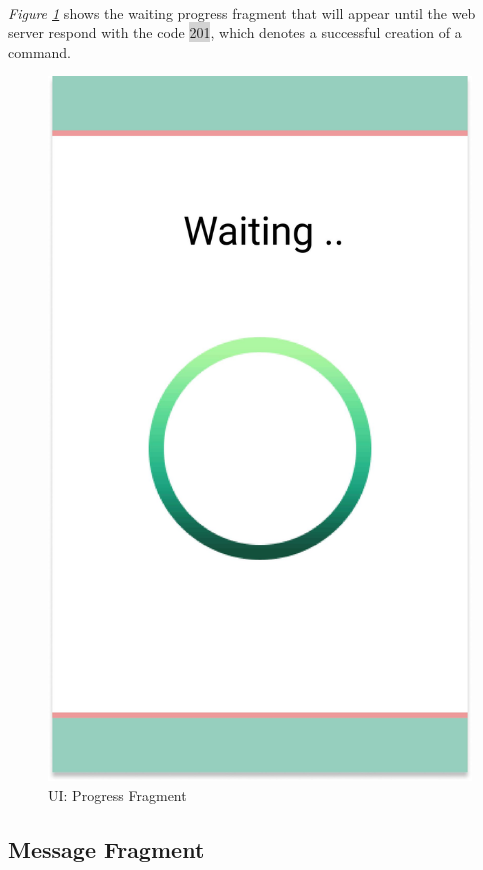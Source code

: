 \documentclass[12pt, oneside, a4paper]{book}
\newcommand{\code}[1]{{\color{red}\colorbox{lightgray}{#1}}}
\begin{document}
		\paragraph{} \textit{Figure \ref{fig:activity_progress}} shows the waiting progress fragment that will appear until the web server respond with the code \code{201}, which denotes a successful creation of a command.
		\begin{figure}[H]
			\centering
			\includegraphics[width=.5\linewidth]{img/activity_progress.jpg}
			\caption{UI: Progress Fragment}
			\label{fig:activity_progress}
		\end{figure}
		\newpage\subsection{Message Fragment}
\end{document}
